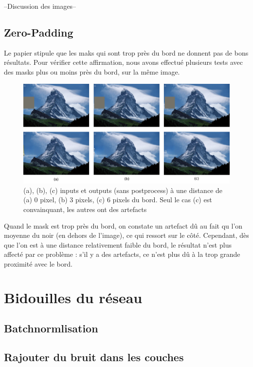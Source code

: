 \documentclass[12pt]{article}
\begin{document}
--Discussion des images--

\subsection{Zero-Padding}

Le papier stipule que les maks qui sont trop près du bord ne donnent pas de bons résultats. Pour vérifier cette affirmation, nous avons effectué plusieurs tests avec des masks plus ou moins près du bord, sur la même image.

\begin{figure}[H]
    \includegraphics[width=1.0\textwidth]{Images/padding.png}
    \caption{(a), (b), (c) inputs et outputs (sans postprocess) à une distance de (a) 0 pixel, (b) 3 pixels, (c) 6 pixels du bord. Seul le cas (c) est convainquant, les autres ont des artefacts}
\end{figure}

Quand le mask est trop près du bord, on constate un artefact dû au fait qu l'on moyenne du noir (en dehors de l'image), ce qui ressort sur le côté. Cependant, dès que l'on est à une distance relativement faible du bord, le résultat n'est plus affecté par ce problème : s'il y a des artefacts, ce n'est plus dû à la trop grande proximité avec le bord.

\section{Bidouilles du réseau}



\subsection{Batchnormlisation}


\subsection{Rajouter du bruit dans les couches}
\end{document}
